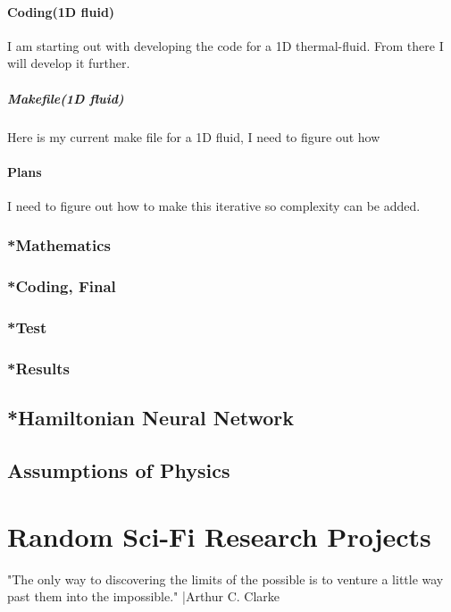 \subsubsection{Coding(1D fluid)}
I am starting out with developing the code for a 1D thermal-fluid. From there I will develop it further.
\paragraph{Makefile(1D fluid)}
Here is my current make file for a 1D fluid, I need to figure out how 

\subsubsection{Plans}
I need to figure out how to make this iterative so complexity can be added.
\subsection{*Mathematics}
\subsection{*Coding, Final}
\subsection{*Test}


\subsection{*Results}

\section{*Hamiltonian Neural Network}
\section{Assumptions of Physics}

\chapter{Random Sci-Fi Research Projects}
"The only way to discovering the limits of the possible is to venture a little way past them into the impossible." |Arthur C. Clarke
